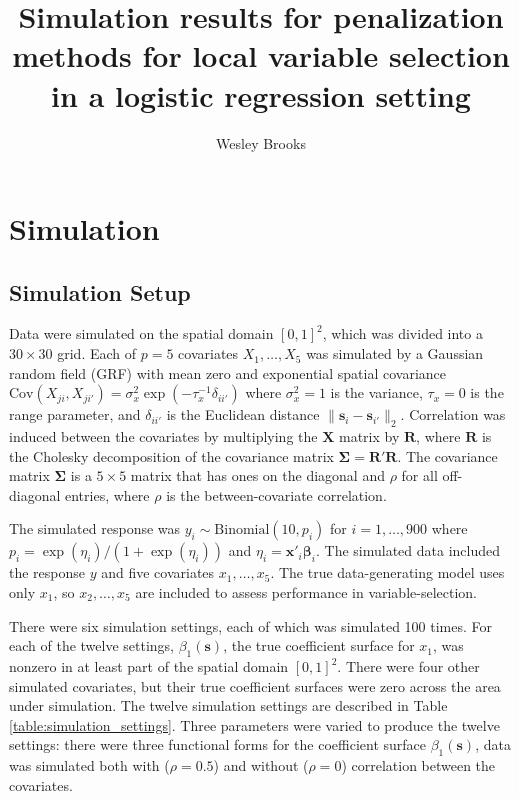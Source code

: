 \documentclass[authoryear, review, 11pt]{elsarticle}
\title{Simulation results for penalization methods for local variable selection in a logistic regression setting}
\author{Wesley Brooks}
\date{}                                           %
\begin{document}
\maketitle


\section{Simulation \label{sec:simulation}}
	\subsection{Simulation Setup}
	Data were simulated on the spatial domain $[0,1]^2$, which was divided into a $30 \times 30$ grid. Each of $p=5$ covariates $X_1, \dots, X_5$ was simulated by a Gaussian random field (GRF) with mean zero and exponential spatial covariance $\text{Cov} \left(X_{ji}, X_{ji'} \right) = \sigma_x^2 \exp{\left( -\tau_x^{-1} \delta_{ii'} \right)}$ where $\sigma_x^2=1$ is the variance, $\tau_x = 0$ is the range parameter, and $\delta_{ii'}$ is the Euclidean distance $\|\bm{s}_i - \bm{s}_{i'}\|_2$. Correlation was induced between the covariates by multiplying the $\bm{X}$ matrix by $\bm{R}$, where $\bm{R}$ is the Cholesky decomposition of the covariance matrix $\bm{\Sigma} = \bm{R}'\bm{R}$. The covariance matrix $\bm{\Sigma}$ is a $5 \times 5$ matrix that has ones on the diagonal and $\rho$ for all off-diagonal entries, where $\rho$ is the between-covariate correlation.
		
	The simulated response was $y_i \sim \text{Binomial}(10, p_i)$ for $i=1, \dots, 900$ where $p_i = \exp(\eta_i) / (1 + \exp(\eta_i))$ and $\eta_i = \bm{x}'_i \bm{\beta}_i$. The simulated data included the response $y$ and five covariates $x_1, \dots, x_5$. The true data-generating model uses only $x_1$, so $x_2, \dots, x_5$ are included to assess performance in variable-selection.
	
	There were six simulation settings, each of which was simulated 100 times. For each of the twelve settings, $\beta_1(\bm{s})$, the true coefficient surface for $x_1$, was nonzero in at least part of the spatial domain $[0,1]^2$. There were four other simulated covariates, but their true coefficient surfaces were zero across the area under simulation. The twelve simulation settings are described in Table \ref{table:simulation_settings}. Three parameters were varied to produce the twelve settings: there were three functional forms for the coefficient surface $\beta_1(\bm{s})$, data was simulated both with ($\rho = 0.5$) and without ($\rho = 0$) correlation between the covariates.
	
\end{document}

